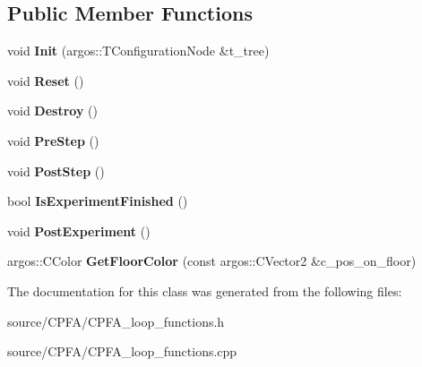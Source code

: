 \subsection*{Public Member Functions}
\begin{DoxyCompactItemize}
\item 
\hypertarget{class_c_p_f_a__loop__functions_a97f6f1c4ac27f57f9d318d30f38ef1b9}{}void {\bfseries Init} (argos\+::\+T\+Configuration\+Node \&t\+\_\+tree)\label{class_c_p_f_a__loop__functions_a97f6f1c4ac27f57f9d318d30f38ef1b9}

\item 
\hypertarget{class_c_p_f_a__loop__functions_ac905a10128796e0bc1d2e7d8e5842dff}{}void {\bfseries Reset} ()\label{class_c_p_f_a__loop__functions_ac905a10128796e0bc1d2e7d8e5842dff}

\item 
\hypertarget{class_c_p_f_a__loop__functions_addb33071e767b219404c551f164c0445}{}void {\bfseries Destroy} ()\label{class_c_p_f_a__loop__functions_addb33071e767b219404c551f164c0445}

\item 
\hypertarget{class_c_p_f_a__loop__functions_a3495b36545b53118cc336be9e954a3ce}{}void {\bfseries Pre\+Step} ()\label{class_c_p_f_a__loop__functions_a3495b36545b53118cc336be9e954a3ce}

\item 
\hypertarget{class_c_p_f_a__loop__functions_a549dd30af6d26d0a080f801752a62e93}{}void {\bfseries Post\+Step} ()\label{class_c_p_f_a__loop__functions_a549dd30af6d26d0a080f801752a62e93}

\item 
\hypertarget{class_c_p_f_a__loop__functions_ad8fc7fe0e1b7c53c5071fa5745352c59}{}bool {\bfseries Is\+Experiment\+Finished} ()\label{class_c_p_f_a__loop__functions_ad8fc7fe0e1b7c53c5071fa5745352c59}

\item 
\hypertarget{class_c_p_f_a__loop__functions_a6841f721718a79cfca7866a9f010837f}{}void {\bfseries Post\+Experiment} ()\label{class_c_p_f_a__loop__functions_a6841f721718a79cfca7866a9f010837f}

\item 
\hypertarget{class_c_p_f_a__loop__functions_ae7dd1962bc63fe18ce9d27615154819a}{}argos\+::\+C\+Color {\bfseries Get\+Floor\+Color} (const argos\+::\+C\+Vector2 \&c\+\_\+pos\+\_\+on\+\_\+floor)\label{class_c_p_f_a__loop__functions_ae7dd1962bc63fe18ce9d27615154819a}

\end{DoxyCompactItemize}


The documentation for this class was generated from the following files\+:\begin{DoxyCompactItemize}
\item 
source/\+C\+P\+F\+A/C\+P\+F\+A\+\_\+loop\+\_\+functions.\+h\item 
source/\+C\+P\+F\+A/C\+P\+F\+A\+\_\+loop\+\_\+functions.\+cpp\end{DoxyCompactItemize}
